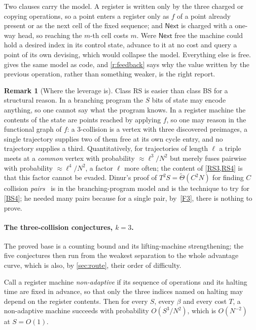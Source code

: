 \documentclass[11pt]{article}
\theoremstyle{plain}
\theoremstyle{definition}
\newtheorem{remark}{Remark}
\newenvironment{cthm}[1]%
  {\renewcommand{\theinnerthm}{#1}%
   \def\theHinnerthm{cthm.\arabic{innerthm}}\innerthm}{\endinnerthm}
\newcommand{\Next}{\mathsf{Next}}
\newcommand{\cls}[1]{\textsf{#1}}   %
\begin{document}
\medskip\noindent
Two clauses carry the model.  A register is written only by the three
charged or copying operations, so a point enters a register only as $f$ of
a point already present or as the next cell of the fixed sequence; and
$\Next$ is charged with a one-way head, so reaching the $m$-th cell costs
$m$.  Were $\Next$ free the machine could hold a desired index in its
control state, advance to it at no cost and query a point of its own
devising, which would collapse the model.  Everything else is free.
 gives the same model as code, and \cref{r:feedback} says
why the value written by the previous operation, rather than something
weaker, is the right report.

\begin{remark}[Where the leverage is]\label{r:leverage}
Class \cls{RS} is easier than class \cls{BS} for a structural reason.  In
a branching program the $S$ bits of state may encode anything, so one
cannot say what the program knows.  In a register machine the contents of
the state are points reached by applying $f$, so one may reason in the
functional graph of $f$: a $3$-collision is a vertex with three discovered
preimages, a single trajectory supplies two of them free at its own
cycle entry, and no trajectory supplies a third.  Quantitatively, for
trajectories of length $\ell$ a triple meets at a \emph{common} vertex with
probability $\approx \ell^3/N^2$ but merely fuses pairwise with probability
$\approx \ell^4/N^2$, a factor $\ell$ more often; the content of
\cref{RS3,RS4} is that this factor cannot be evaded.  Dinur's proof of
$T^2S = \tilde\Theta(C^2N)$ for finding $C$ collision
\emph{pairs}~\cite{Din20} is in the branching-program model and is the
technique to try for \cref{BS4}; he needed many pairs because for a single
pair, by~\ref{F3}, there is nothing to prove.
\end{remark}

\paragraph{The three-collision conjectures, $k=3$.}
The proved base is a counting bound and its lifting-machine strengthening;
the five conjectures then run from the weakest separation to the whole
advantage curve, which is also, by \cref{sec:route}, their order of
difficulty.

\begin{cthm}{RS0}[non-adaptive machines fail]\label{RS0}
Call a register machine \emph{non-adaptive} if its sequence of operations
and its halting time are fixed in advance, so that only the three indices
named on halting may depend on the register contents.  Then for every $S$,
every $\beta$ and every cost $T$, a non-adaptive machine succeeds with
probability $O(S^{3}/N^{2})$, which is $O(N^{-2})$ at $S = O(1)$.
\end{cthm}
\end{document}
